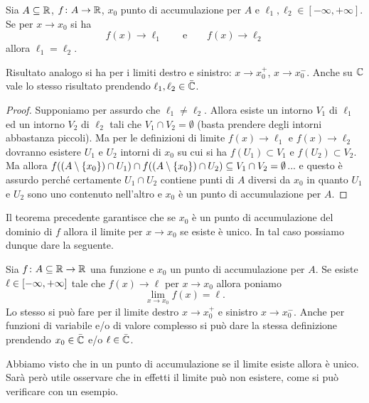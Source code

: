 \begin{theorem}
\mymark{*}
Sia $A\subseteq {\mathbb R}$, $f\colon A \to {\mathbb R}$, $x_0$
punto di accumulazione per $A$ e $\ell_1, \ell_2\in [-\infty,+\infty]$.
Se per $x\to x_0$ si ha
\[
  f(x) \to \ell_1 \qquad\text{e}\qquad f(x) \to \ell_2
\]
allora $\ell_1=\ell_2$.

Risultato analogo si ha per i limiti destro e sinistro: $x\to x_0^+$, 
$x\to x_0^-$.
Anche su ${\mathbb C}$ vale lo stesso risultato
prendendo $\ell_1,\ell_2\in \bar {{\mathbb C}}$.
\end{theorem}
%
\begin{proof}
\mymark{*}
Supponiamo per assurdo che $\ell_1\neq \ell_2$.
Allora esiste un intorno $V_1$ di $\ell_1$ ed un intorno $V_2$ di $\ell_2$
tali che $V_1\cap V_2 = \emptyset$ (basta prendere degli intorni abbastanza piccoli). 
Ma per le definizioni di limite $f(x)\to \ell_1$ e $f(x)\to \ell_2$ 
dovranno esistere $U_1$ e $U_2$ intorni di $x_0$ su cui si ha 
$f(U_1)\subset V_1$ e $f(U_2)\subset V_2$. 
Ma allora $f((A\setminus{\left\{ x_0 \right\}})\cap U_1)\cap f((A\setminus{\left\{ x_0 \right\}})\cap U_2)\subseteq V_1\cap V_2 = \emptyset$... 
e questo è assurdo perché certamente $U_1\cap U_2$ 
contiene punti di $A$ diversi da $x_0$ in quanto 
$U_1$ e $U_2$ sono uno contenuto nell'altro e $x_0$ 
è un punto di accumulazione per $A$.
\end{proof}

Il teorema precedente garantisce che se $x_0$ è un punto di accumulazione 
del dominio di $f$ allora il limite per $x\to x_0$ se esiste è unico. 
In tal caso possiamo dunque dare la seguente.
%
\begin{definition}
Sia $f\colon A\subseteq {\mathbb R} \to {\mathbb R}$ una funzione e $x_0$ 
un punto di accumulazione per $A$. 
Se esiste $\ell\in\left[-\infty,+\infty\right]$ tale che
$f(x)\to \ell$ per $x\to x_0$ allora poniamo
\[
  \lim_{x\to x_0} f(x) = \ell.
\]
Lo stesso si può fare per il limite destro $x\to x_0^+$ 
e sinistro $x\to x_0^-$.
Anche per funzioni di variabile e/o di valore 
complesso si può dare la stessa definizione prendendo $x_0\in \bar {{\mathbb C}}$ 
e/o $\ell\in \bar {{\mathbb C}}$.
\end{definition}

Abbiamo visto che in un punto di accumulazione se il limite 
esiste allora è unico.
Sarà però utile osservare che in effetti il limite può non 
esistere, come si può verificare con un esempio.

